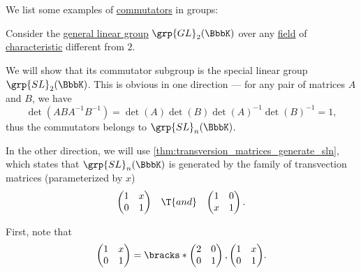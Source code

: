 \begin{example}\label{ex:def:group_commutator}
  We list some examples of \hyperref[def:group_commutator]{commutators} in groups:
  \begin{thmenum}
     Consider the \hyperref[def:linear_groups]{general linear group} \( \grp{GL}_2(\BbbK) \) over any \hyperref[def:field]{field} of \hyperref[def:ring_characteristic]{characteristic} different from \( 2 \).

    We will show that its commutator subgroup is the special linear group \( \grp{SL}_2(\BbbK) \). This is obvious in one direction --- for any pair of matrices \( A \) and \( B \), we have
    \begin{equation*}
      \det(AB A^{-1} B^{-1}) = \det(A) \det(B) \det(A)^{-1} \det(B)^{-1} = 1,
    \end{equation*}
    thus the commutators belongs to \( \grp{SL}_n(\BbbK) \).

    In the other direction, we will use \cref{thm:transversion_matrices_generate_sln}, which states that \( \grp{SL}_n(\BbbK) \) is generated by the family of transvection matrices (parameterized by \( x \))
    \begin{align*}
      \begin{pmatrix}
        1 & x \\
        0 & 1
      \end{pmatrix}
      &&
      \T{and}
      &&
      \begin{pmatrix}
        1 & 0 \\
        x & 1
      \end{pmatrix}.
    \end{align*}

    First, note that
    \begin{align*}
      \begin{pmatrix}
        1 & x \\
        0 & 1
      \end{pmatrix}
      =
      \bracks*
        {
          \begin{pmatrix}
            2 & 0 \\
            0 & 1
          \end{pmatrix},
          \begin{pmatrix}
            1 & x \\
            0 & 1
          \end{pmatrix}
        }.
    \end{align*}


\end{thmenum}
\end{example}

